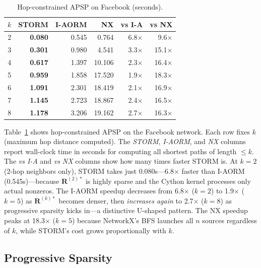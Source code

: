 \documentclass[journal]{IEEEtran}
\begin{document}
\begin{table}[t]
\centering
\caption{Hop-constrained APSP on Facebook (seconds).}
\label{tab:hop}
\setlength{\tabcolsep}{3pt}
\begin{tabular}{@{}rrrrrr@{}}
\toprule
$k$ & \textbf{STORM} & \textbf{I-AORM} & \textbf{NX} & \textbf{vs I-A} & \textbf{vs NX} \\
\midrule
2 & \textbf{0.080} & 0.545 & 0.764 & 6.8$\times$ & 9.6$\times$ \\
3 & \textbf{0.301} & 0.980 & 4.541 & 3.3$\times$ & 15.1$\times$ \\
4 & \textbf{0.617} & 1.397 & 10.106 & 2.3$\times$ & 16.4$\times$ \\
5 & \textbf{0.959} & 1.858 & 17.520 & 1.9$\times$ & 18.3$\times$ \\
6 & \textbf{1.091} & 2.301 & 18.419 & 2.1$\times$ & 16.9$\times$ \\
7 & \textbf{1.145} & 2.723 & 18.867 & 2.4$\times$ & 16.5$\times$ \\
8 & \textbf{1.178} & 3.206 & 19.162 & 2.7$\times$ & 16.3$\times$ \\
\bottomrule
\end{tabular}
\end{table}

Table~\ref{tab:hop} shows hop-constrained APSP on the Facebook network. Each row fixes $k$ (maximum hop distance computed). The \emph{STORM}, \emph{I-AORM}, and \emph{NX} columns report wall-clock time in seconds for computing all shortest paths of length $\leq k$. The \emph{vs I-A} and \emph{vs NX} columns show how many times faster STORM is. At $k=2$ (2-hop neighbors only), STORM takes just 0.080s---6.8$\times$ faster than I-AORM (0.545s)---because $\mathbf{R}^{(2)*}$ is highly sparse and the Cython kernel processes only actual nonzeros. The I-AORM speedup decreases from 6.8$\times$ ($k=2$) to 1.9$\times$ ($k=5$) as $\mathbf{R}^{(k)*}$ becomes denser, then \emph{increases again} to 2.7$\times$ ($k=8$) as progressive sparsity kicks in---a distinctive U-shaped pattern. The NX speedup peaks at 18.3$\times$ ($k=5$) because NetworkX's BFS launches all $n$ sources regardless of $k$, while STORM's cost grows proportionally with $k$.


\subsection{Progressive Sparsity}
\end{document}
